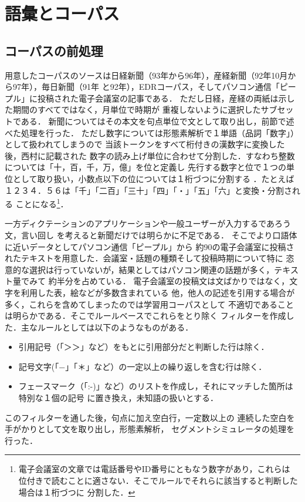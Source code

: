 \section{語彙とコーパス}
\subsection{コーパスの前処理}
用意したコーパスのソースは日経新聞（93年から96年），\mbox{産経新聞（92年10月から97年），}毎日新聞（91年
と92年），EDRコーパス\cite{EDR}，\mbox{そしてパソコン通信「ピープル」に投}稿された電子会議室の記事である．
ただし日経，産経の両紙は示した期間のすべてではなく，月単位で時期が
重複しないように選択したサブセットである．
新聞についてはその本文を句点単位で文として取り出し，前節で述べた処理を行った．
ただし数字については形態素解析で１単語（品詞「数字」）として扱われてしまうので
当該トークンをすべて桁付きの漢数字に変換した後，西村\cite{NISIMURA3}に記載された
数字の読み上げ単位に合わせて分割した．すなわち整数については「十，百，千，万，億」を位と定義し
先行する数字と位で１つの単位として取り扱い，小数点以下の位については１桁づつに分割する
．たとえば１２３４．５６は「千」「二百」「三十」「四」「・」「五」「六」と変換・分割される
ことになる\footnote{電子会議室の文章では電話番号やID番号にともなう数字があり，これらは
位付きで読むことに適さない．そこでルールでそれらに該当すると判断した場合は１桁づつに
分割した．}．
\par
一方ディクテーションのアプリケーションや一般ユーザーが入力するであろう文，言い回し
を考えると新聞だけでは明らかに不足である．
そこでより口語体に近いデータとしてパソコン通信「ピープル」から
約90の電子会議室に投稿されたテキストを用意した．会議室・話題の種類そして投稿時期について特に
恣意的な選択は行っていないが，結果としてはパソコン関連の話題が多く，テキスト量でみて
約半分を占めている．
電子会議室の投稿文は文ばかりではなく，文字を利用した表，絵などが多数含まれている
他，他人の記述を引用する場合が多く，これらを含めてしまったのでは学習用コーパスとして
不適切であることは明らかである．そこでルールベースでこれらをとり除く
フィルターを作成した．主なルールとしては以下のようなものがある．
\begin{itemize}
   \item 引用記号（「＞＞」など）をもとに引用部分だと判断した行は除く．
   \item 記号文字(「−」「＊」など）の一定以上の繰り返しを含む行は除く．
   \item フェースマーク（「:-)」など）のリストを作成し，それにマッチした箇所は特別な１個の記号
に置き換え，未知語の扱いとする．
\end{itemize}
このフィルターを通した後，句点に加え空白行，一定数以上の
連続した空白を手がかりとして文を取り出し，形態素解析，
セグメントシミュレータの処理を行った．
\vspace{-2mm}
